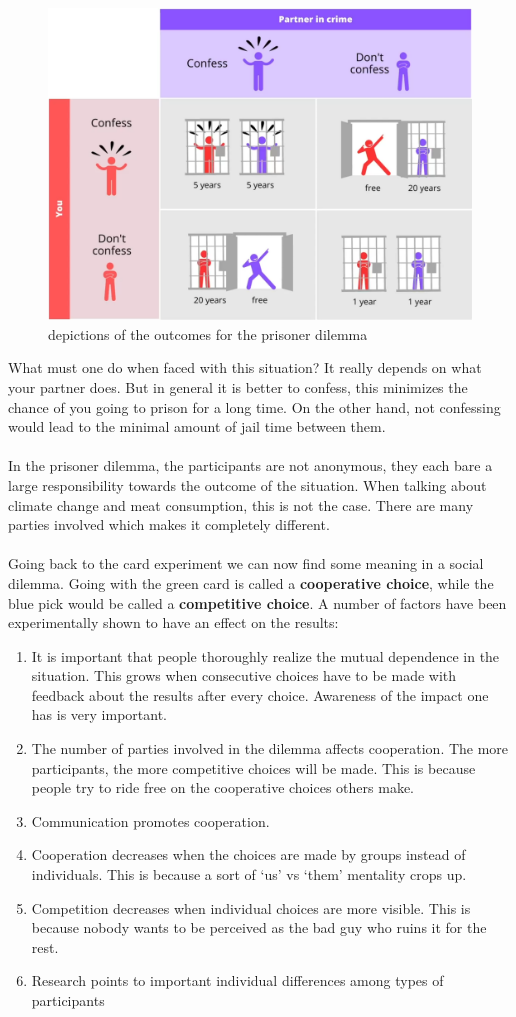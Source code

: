 \documentclass[../summary.tex]{subfiles}
\begin{document}
			\begin{figure}[h]
				\centering
				\includegraphics[width=0.7\linewidth]{../images/12-prisoners-dilemma.png}
				\caption{depictions of the outcomes for the prisoner dilemma}
				\label{fig:12-prisoners-dilemma}
			\end{figure}
			What must one do when faced with this situation? It really depends on what your partner does. But in general it is better to confess, this minimizes the chance of you going to prison for a long time. On the other hand, not confessing would lead to the minimal amount of jail time between them. \\
			\\
			In the prisoner dilemma, the participants are not anonymous, they each bare a large responsibility towards the outcome of the situation. When talking about climate change and meat consumption, this is not the case. There are many parties involved which makes it completely different. \\
			\\
			\newpage
			Going back to the card experiment we can now find some meaning in a social dilemma. Going with the green card is called a \textbf{cooperative choice}, while the blue pick would be called a \textbf{competitive choice}.  A number of factors have been experimentally shown to have an effect on the results:
			\begin{enumerate}
				\item It is important that people thoroughly realize the mutual dependence in the situation. This grows when consecutive choices have to be made with feedback about the results after every choice. Awareness of the impact one has is very important. 
				\item The number of parties involved in the dilemma affects cooperation. The more participants, the more competitive choices will be made. This is because people try to ride free on the cooperative choices others make. 
				\item Communication promotes cooperation. 
				\item Cooperation decreases when the choices are made by groups instead of individuals. This is because a sort of `us' vs `them' mentality crops up. 
				\item Competition decreases when individual choices are more visible. This is because nobody wants to be perceived as the bad guy who ruins it for the rest.
				\item Research points to important individual differences among types of participants
			\end{enumerate}
		\newpage
\end{document}
